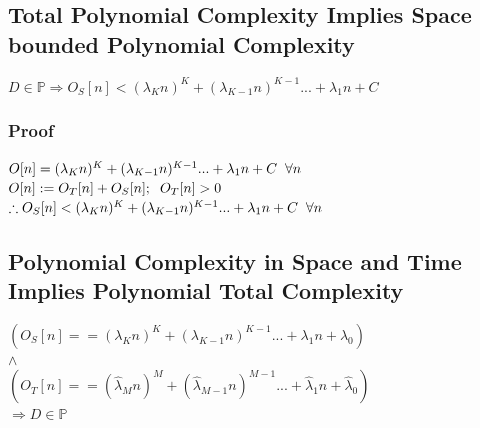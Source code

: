 \documentclass[11pt]{article}
\begin{document}
\subsection{Total Polynomial Complexity Implies Space bounded Polynomial Complexity}
\begin{center}
\vspace{1mm}
$
D \in \mathbb{P} \Longrightarrow O_S[n] <  (\lambda_K n)^K + (\lambda_{K-1} n)^{K-1}... + \lambda_1 n + C
$
\end{center}

\subsubsection{Proof}
\begin{center}
$
O[n] = (\lambda_K n)^K + (\lambda_{K-1} n)^{K-1}... + \lambda_1 n + C \hspace{2mm} \forall n
$
\\ \vspace{2mm}
$
O[n] := O_T[n] + O_S[n]; \hspace{2mm} O_T[n] > 0
$
\\ \vspace{2mm}
$
\therefore O_S[n] < (\lambda_K n)^K + (\lambda_{K-1} n)^{K-1}... + \lambda_1 n + C \hspace{2mm} \forall n
$
\end{center}










\subsection{Polynomial Complexity in Space and Time Implies Polynomial Total Complexity}
\begin{center}
\vspace{1mm}
$
(O_S[n] == (\lambda_K n)^K + (\lambda_{K-1} n)^{K-1}... + \lambda_1 n + \lambda_0)
$
\\ \vspace{2mm}
$
\land
$
\\ \vspace{2mm}
$
(O_T[n] == (\hat{\lambda}_M n)^M + (\hat{\lambda}_{M-1} n)^{M-1}... + \hat{\lambda}_1 n + \hat{\lambda}_0)
$
\\ \vspace{4mm}
$
\Rightarrow D \in \mathbb{P}
$
\end{center}
\end{document}
